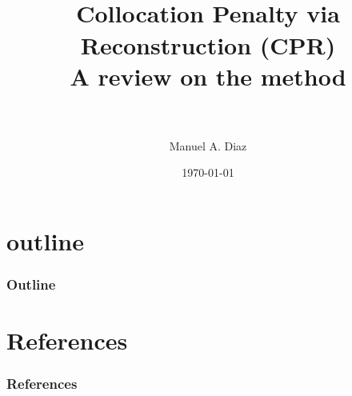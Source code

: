 

\title[CPR Review \hspace{4em}\insertframenumber/\inserttotalframenumber]{~ \\ Collocation Penalty via Reconstruction (CPR)\\ A review on the method \\~} %
\author[Aerodynamic Design \& Analysis Lab]{ Manuel A. Diaz} %
\date{\today}



\begin{frame}
	\maketitle
\end{frame}

\section*{outline}
\begin{frame} \frametitle{Outline}
	\tableofcontents
\end{frame}



%





\section{References}

\begin{frame}[allowframebreaks]
	\frametitle{References}
	
	
\end{frame}

